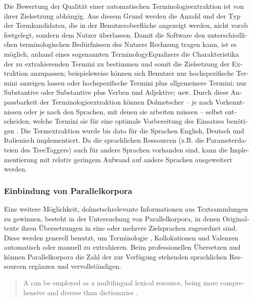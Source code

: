 \documentclass[output=paper]{LSP/langsci}
\begin{document}
\begin{otherlanguage}{ngerman}
Die Bewertung der Qualität einer automatischen Terminologieextraktion ist von ihrer Zielsetzung abhängig. Aus diesem Grund werden die Anzahl und der Typ der Termkandidaten, die in der Benutzeroberfläche angezeigt werden, nicht vorab festgelegt, sondern dem Nutzer überlassen. Damit die Software den unterschiedlichen terminologischen Bedürfnissen des Nutzers Rechnung tragen kann, ist es möglich, anhand eines sogenannten TerminologyEqualizers die Charakteristika der zu extrahierenden Termini zu bestimmen und somit die Zielsetzung der Extraktion anzupassen; beispielsweise können sich Benutzer nur hochspezifische Termini anzeigen lassen oder hochspezifische Termini plus allgemeinere Termini; nur Substantive oder Substantive plus Verben und Adjektive; usw. Durch diese Anpassbarkeit der Terminologieextraktion können Dolmetscher -- je nach Vorkenntnissen oder je nach den Sprachen, mit denen sie arbeiten müssen -- selbst entscheiden, welche Termini sie für eine optimale Vorbereitung des Einsatzes benötigen \citep{Fantinuoli2006}. Die Termextraktion wurde bis dato für die Sprachen English, Deutsch und Italienisch implementiert. Da die sprachlichen Ressourcen (z.B. die Parameterdateien des TreeTaggers) auch für andere Sprachen vorhanden sind, kann die Implementierung mit relativ geringem Aufwand auf andere Sprachen ausgeweitert werden.

\subsubsection{Einbindung von Parallelkorpora}\label{sec:fantinuoli:6.1.3}

Eine weitere Möglichkeit, dolmetschrelevante Informationen aus Textsammlungen zu gewinnen, besteht in der Untersuchung von Parallelkorpora, in denen Originaltexte ihren Übersetzungen in eine oder mehrere Zielsprachen zugeordnet sind. Diese werden generell benutzt, um Terminologie \citep{Pearson2003}, Kollokationen \citep{Teubert2003} und Valenzen \citep{culo_automatische_2011} automatisch oder manuell zu extrahieren. Beim professionellen Übersetzen und  können Parallelkorpora die Zahl der zur Verfügung stehenden sprachlichen Ressourcen ergänzen und vervollständigen.

\begin{quote}
A  can be employed as a multilingual lexical resource, being more comprehensive and diverse than dictionaries \citep[1168]{Hansen-Schirra2008}.
\end{quote}


\end{otherlanguage}
\end{document}
